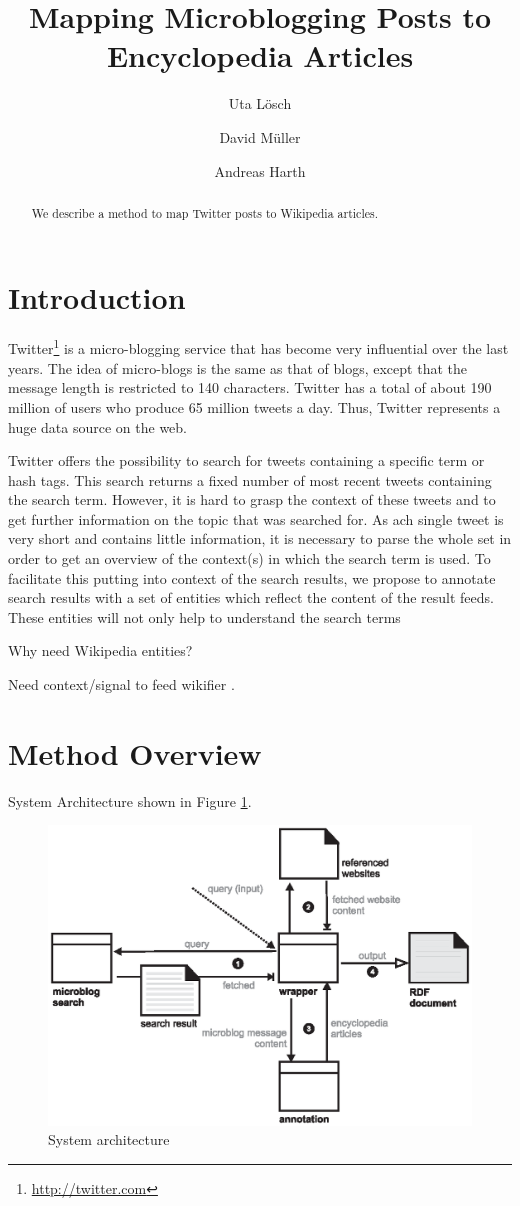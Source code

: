 \documentclass{llncs}
\title{Mapping Microblogging Posts to Encyclopedia Articles}
\author{Uta L\"{o}sch \and David M\"{u}ller \and Andreas Harth}
\institute{
	Karlsruhe Institute of Technology (KIT), D-76131 Karlsruhe, Germany\\ 
	\email{uta.loesch@kit.edu},\\
	\email{david.mueller@student.kit.edu},\\
	\email{harth@kit.edu}
}
\begin{document}
\maketitle

\begin{abstract}
We describe a method to map Twitter posts to Wikipedia articles.
\end{abstract}

\section{Introduction}

Twitter\footnote{\url{http://twitter.com}} is a micro-blogging service that has become very influential over the last years. The idea of micro-blogs is the same as that of blogs, except that the message length is restricted to 140 characters. Twitter has a total of about 190 million of users who produce 65 million tweets a day. Thus, Twitter represents a huge data source on the web.

Twitter offers the possibility to search for tweets containing a specific term or hash tags. This search returns a fixed number of most recent tweets containing the search term. However, it is hard to grasp the context of these tweets and to get further information on the topic that was searched for. As ach single tweet is very short and contains little information, it is necessary to parse the whole set in order to get an overview of the context(s) in which the search term is used. To facilitate this putting into context of the search results, we propose to annotate search results with a set of entities which reflect the content of the result feeds. These entities will not only help to understand the search terms

Why need Wikipedia entities?

Need context/signal to feed wikifier \cite{key:wikifier}.

\section{Method Overview}

System Architecture shown in Figure \ref{fig:arch}.

\begin{figure}[htb]
  \centering
  \includegraphics[width=.6\linewidth]{architecture}
  \caption{System architecture}
  \label{fig:arch}
\end{figure}
\end{document}
